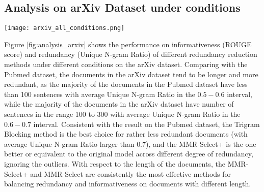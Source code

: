 \documentclass[11pt,a4paper]{article}
\begin{document}
\subsection{Analysis on arXiv Dataset under conditions}
\begin{figure*}[htb!]
    \centering
\texttt{[image: arxiv\_all\_conditions.png]}
    \caption{Comparing the average ROUGE scores and average unique n-gram ratios of different models on the arXiv dataset, conditioned on different degrees of redundancy and lengths of the document.\footnotemark}
    \label{fig:analysis_arxiv}
\end{figure*}
Figure \ref{fig:analysis_arxiv} shows the performance on informativeness (ROUGE score) and redundancy (Unique N-gram Ratio) of different redundancy reduction methods under different conditions on the arXiv dataset. Comparing with the Pubmed dataset, the documents in the arXiv dataset tend to be longer and more redundant, as the majority of the documents in the Pubmed dataset have less than 100 sentences with average Unique N-gram Ratio in the $0.5-0.6$ interval, while the majority of the documents in the arXiv dataset have number of sentences in the range 100 to 300 with average Unique N-gram Ratio in the $0.6-0.7$ interval. Consistent with the result on the Pubmed dataset, the Trigram Blocking method is the best choice for rather less redundant documents (with average Unique N-gram Ratio larger than $0.7$), and the MMR-Select+ is the one better or equivalent to the original model across different degree of redundancy, ignoring the outliers. With respect to the length of the documents, the MMR-Select+ and MMR-Select are consistently the most effective methods for balancing redundancy and informativeness on documents with different length.
\end{document}

